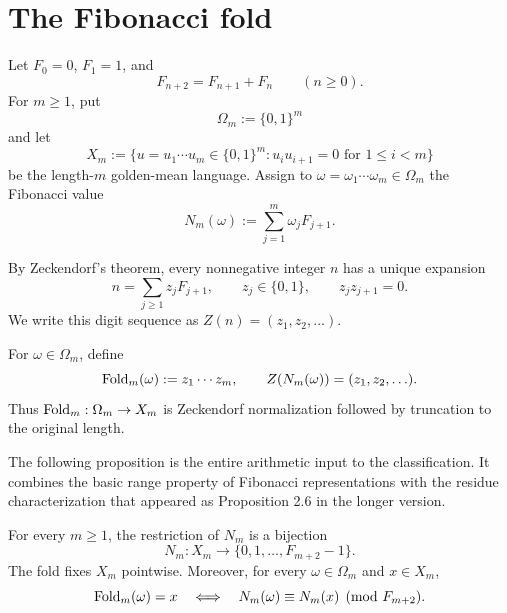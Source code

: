 \section{The Fibonacci fold}\label{sec:fold}

Let \(F_0=0\), \(F_1=1\), and
\[
F_{n+2}=F_{n+1}+F_n\qquad(n\geq0).
\]
For \(m\geq1\), put
\[
\Omega_m:=\{0,1\}^m
\]
and let
\[
X_m:=\{u=u_1\cdots u_m\in\{0,1\}^m:
u_iu_{i+1}=0\text{ for }1\leq i<m\}
\]
be the length-\(m\) golden-mean language.  Assign to
\(\omega=\omega_1\cdots\omega_m\in\Omega_m\) the Fibonacci value
\[
N_m(\omega):=\sum_{j=1}^m\omega_jF_{j+1}.
\]

By Zeckendorf's theorem, every nonnegative integer \(n\) has a unique
expansion
\[
n=\sum_{j\geq1}z_jF_{j+1},
\qquad z_j\in\{0,1\},\qquad z_jz_{j+1}=0.
\]
We write this digit sequence as \(Z(n)=(z_1,z_2,\ldots)\).

\begin{definition}\label{def:canonical-fold}
For \(\omega\in\Omega_m\), define
\[
\operatorname{Fold}_m(\omega):=z_1\cdots z_m,
\qquad Z(N_m(\omega))=(z_1,z_2,\ldots).
\]
Thus \(\operatorname{Fold}_m:\Omega_m\to X_m\) is Zeckendorf normalization followed by
truncation to the original length.
\end{definition}

The following proposition is the entire arithmetic input to the
classification.  It combines the basic range property of Fibonacci
representations with the residue characterization that appeared as
Proposition 2.6 in the longer version.

\begin{proposition}\label{prop:fold-residue-characterization}
For every \(m\geq1\), the restriction of \(N_m\) is a bijection
\[
N_m:X_m\longrightarrow\{0,1,\ldots,F_{m+2}-1\}.
\]
The fold fixes \(X_m\) pointwise.  Moreover, for every
\(\omega\in\Omega_m\) and \(x\in X_m\),
\[
\operatorname{Fold}_m(\omega)=x
\quad\Longleftrightarrow\quad
N_m(\omega)\equiv N_m(x)\pmod{F_{m+2}}.
\]
\end{proposition}

